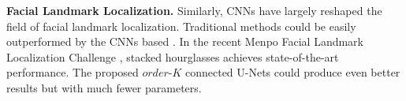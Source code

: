 {\bf Facial Landmark Localization.}
Similarly, CNNs have largely reshaped the field of facial landmark localization. Traditional methods could be easily outperformed by the CNNs based \cite{zhang2014coarse,zhang2014facial,lv2017deep,peng2016recurrent,peng2018red}. In the recent Menpo Facial Landmark Localization Challenge \cite{zafeiriou2017menpo}, stacked hourglasses \cite{newell2016stacked} achieves state-of-the-art performance. The proposed $order$-$K$ connected U-Nets could produce even better results but with much fewer parameters.

